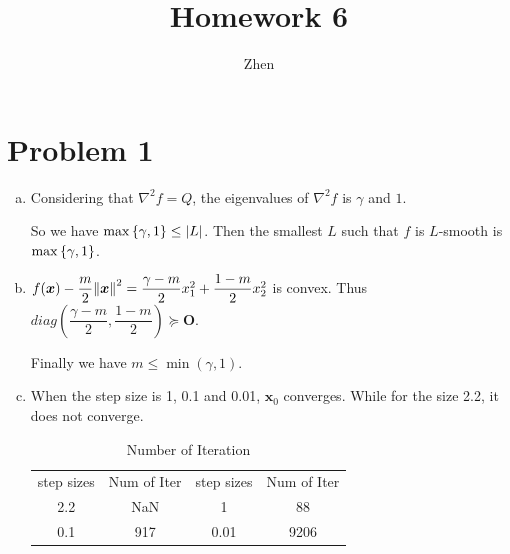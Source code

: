 \documentclass{article}
\def\bx{\boldsymbol{x}}
\def\bO{\boldsymbol{O}}
\begin{document}
\title{Homework 6}
\author{Zhen}
\maketitle


\section*{Problem 1}
\begin{enumerate}[(a).]

	\item Considering that $\nabla^2f=Q$, the eigenvalues of $\nabla^2f$ is $\gamma$ and $1$.

		So we have $\max\qty{\gamma,1}\le \abs{L}$. Then the smallest $L$ such that $f$ is $L$-smooth is $\max\qty{\gamma,1}$.

	\item 
		$f(\bx)-\dfrac{m}{2}\norm{\bx}^2=
		\dfrac{\gamma-m}{2}x_1^2+
		\dfrac{1-m}{2}x_2^2$ is convex.
		Thus $diag(\dfrac{\gamma-m}{2},\dfrac{1-m}{2})\succeq \bO$.

		Finally we have $m\le \min(\gamma,1)$.
	\item
		When the step size is 1, 0.1 and 0.01, $\bx_0$ converges. While for the size 2.2, it does not converge.
		\begin{table}[h]
			\centering
			\begin{tabular}{c|c|c|c}
				step sizes & Num of Iter & step sizes & Num of Iter \\
				2.2 & NaN & 1 & 88 \\
				0.1 & 917 & 0.01 & 9206 \\
			\end{tabular}
			\caption{Number of Iteration}
		\end{table}


\end{enumerate}
\end{document}
